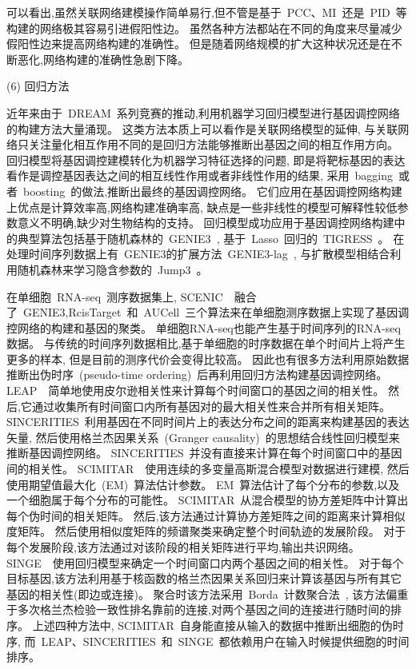 可以看出,虽然关联网络建模操作简单易行,但不管是基于~PCC、MI~还是~PID~等构建的网络极其容易引进假阳性边。
虽然各种方法都站在不同的角度来尽量减少假阳性边来提高网络构建的准确性。
但是随着网络规模的扩大这种状况还是在不断恶化,网络构建的准确性急剧下降。

(6) 回归方法

近年来由于~DREAM~系列竞赛的推动,利用机器学习回归模型进行基因调控网络的构建方法大量涌现。
这类方法本质上可以看作是关联网络模型的延伸,
与关联网络只关注量化相互作用不同的是回归方法能够推断出基因之间的相互作用方向。
回归模型将基因调控建模转化为机器学习特征选择的问题,
即是将靶标基因的表达看作是调控基因表达之间的相互线性作用或者非线性作用的结果,
采用~bagging~或者~boosting~的做法,推断出最终的基因调控网络。
它们应用在基因调控网络构建上优点是计算效率高,网络构建准确率高,
缺点是一些非线性的模型可解释性较低参数意义不明确,缺少对生物结构的支持。
回归模型成功应用于基因调控网络构建中的典型算法包括基于随机森林的~GENIE3~\cite{Huynh-Thu2010},
基于~Lasso~回归的~TIGRESS~\cite{Haury2012}。
在处理时间序列数据上有~GENIE3的扩展方法~GENIE3-lag~\cite{huynh2012machine},
与扩散模型相结合利用随机森林来学习隐含参数的~Jump3~\cite{Huynh-Thu2014}。

在单细胞~RNA-seq~测序数据集上, 
SCENIC~\cite{aibar2017scenic}~融合了~GENIE3,RcisTarget~和~AUCell~三个算法来在单细胞测序数据上实现了基因调控网络的构建和基因的聚类。
单细胞RNA-seq也能产生基于时间序列的RNA-seq数据。
与传统的时间序列数据相比,基于单细胞的时序数据在单个时间片上将产生更多的样本, 但是目前的测序代价会变得比较高。
因此也有很多方法利用原始数据推断出伪时序~(pseudo-time ordering)~后再利用回归方法构建基因调控网络。
LEAP~\cite{specht2017leap}~简单地使用皮尔逊相关性来计算每个时间窗口的基因之间的相关性。 
然后,它通过收集所有时间窗口内所有基因对的最大相关性来合并所有相关矩阵。
SINCERITIES~\cite{papili2017sincerities}利用基因在不同时间片上的表达分布之间的距离来构建基因的表达矢量,
然后使用格兰杰因果关系~(Granger causality)~的思想结合线性回归模型来推断基因调控网络。
SINCERITIES~并没有直接来计算在每个时间窗口中的基因间的相关性。
SCIMITAR~\cite{cordero2017tracing}~使用连续的多变量高斯混合模型对数据进行建模,
然后使用期望值最大化~(EM)~算法估计参数。
EM~算法估计了每个分布的参数,以及一个细胞属于每个分布的可能性。
SCIMITAR~从混合模型的协方差矩阵中计算出每个伪时间的相关矩阵。
然后,该方法通过计算协方差矩阵之间的距离来计算相似度矩阵。
然后使用相似度矩阵的频谱聚类来确定整个时间轨迹的发展阶段。
对于每个发展阶段,该方法通过对该阶段的相关矩阵进行平均,输出共识网络。
SINGE~\cite{deshpande2019network}~使用回归模型来确定一个时间窗口内两个基因之间的相关性。
对于每个目标基因,该方法利用基于核函数的格兰杰因果关系回归来计算该基因与所有其它基因的相关性(即边或连接)。
聚合时该方法采用~Borda~计数聚合法~\cite{van2000variants},
该方法偏重于多次格兰杰检验一致性排名靠前的连接,对两个基因之间的连接进行随时间的排序。
上述四种方法中, SCIMITAR~自身能直接从输入的数据中推断出细胞的伪时序, 
而~LEAP、SINCERITIES~和~SINGE~都依赖用户在输入时候提供细胞的时间排序。

